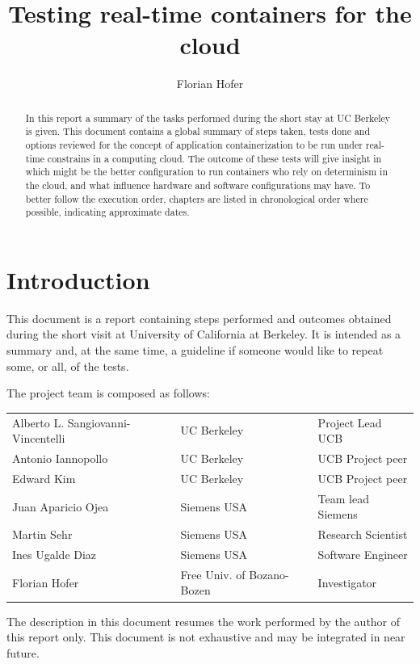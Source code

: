 \documentclass[]{scrartcl}
\title{Testing real-time containers for the cloud}
\author{Florian Hofer}
\date{}
\begin{document}
\maketitle

\begin{abstract}
	In this report a summary of the tasks performed during the short stay at UC Berkeley is given.
	This document contains a global summary of steps taken, tests done and options reviewed for the concept of application containerization to be run under real-time constrains in a computing cloud. The outcome of these tests will give insight in which might be the better configuration to run containers who rely on determinism in the cloud, and what influence hardware and software configurations may have.
	To better follow the execution order, chapters are listed in chronological order  where possible, indicating approximate dates.
\end{abstract}

\section{Introduction}

This document is a report containing steps performed and outcomes obtained during the short visit at University of California at Berkeley. It is intended as a summary and, at the same time, a guideline if someone would like to repeat some, or all, of the tests.

The project team is composed as follows:

\begin{table}[H]
	\begin{tabular}{l l l}
		Alberto L. Sangiovanni-Vincentelli & UC Berkeley & Project Lead UCB \\
		Antonio Iannopollo & UC Berkeley & UCB Project peer \\
		Edward Kim & UC Berkeley & UCB Project peer \\
		Juan Aparicio Ojea & Siemens USA & Team lead Siemens\\
		Martin Sehr & Siemens USA & Research Scientist\\
		Ines Ugalde Diaz & Siemens USA & Software Engineer \\
		Florian Hofer & Free Univ. of Bozano-Bozen & Investigator \\		
	\end{tabular}
\end{table}

The description in this document resumes the work performed by the author of this report only.
This document is not exhaustive and may be integrated in near future.
\end{document}
